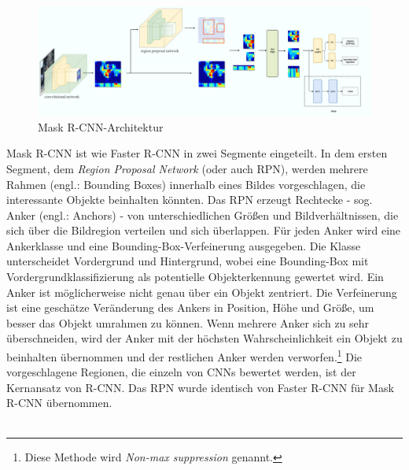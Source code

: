 \begin{figure}[ht]
  \centering
  \includegraphics[width=\textwidth]{pics/maskrcnn-archtecture.PNG}
  \caption[Mask R-CNN-Architektur]{Mask R-CNN-Architektur\cite{ref:mask-rcnn-architecture}}
  \label{fig:maskrcnn-architecture}
\end{figure}
\noindent
Mask R-CNN ist wie Faster R-CNN in zwei Segmente eingeteilt. In dem ersten Segment, dem \textit{Region Proposal Network} (oder auch RPN), werden mehrere Rahmen (engl.: Bounding Boxes) innerhalb eines Bildes vorgeschlagen, die interessante Objekte beinhalten könnten. Das RPN erzeugt Rechtecke - sog. Anker (engl.: Anchors) - von unterschiedlichen Größen und Bildverhältnissen, die sich über die Bildregion verteilen und sich überlappen. Für jeden Anker wird eine Ankerklasse und eine Bounding-Box-Verfeinerung ausgegeben. Die Klasse unterscheidet Vordergrund und Hintergrund, wobei eine Bounding-Box mit Vordergrundklassifizierung als potentielle Objekterkennung gewertet wird. Ein Anker ist möglicherweise nicht genau über ein Objekt zentriert. Die Verfeinerung ist eine geschätze Veränderung des Ankers in Position, Höhe und Größe, um besser das Objekt umrahmen zu können. Wenn mehrere Anker sich zu sehr überschneiden, wird der Anker mit der höchsten Wahrscheinlichkeit ein Objekt zu beinhalten übernommen und der restlichen Anker werden verworfen.\footnote{Diese Methode wird \textit{Non-max suppression} genannt.}\cite{ref:matterport:maskrcnn}\cite{ref:faster-r-cnn} Die vorgeschlagene Regionen, die einzeln von CNNs bewertet werden, ist der Kernansatz von R-CNN. Das RPN wurde identisch von Faster R-CNN für Mask R-CNN übernommen.\cite{ref:maskrcnn} 
\\\\
